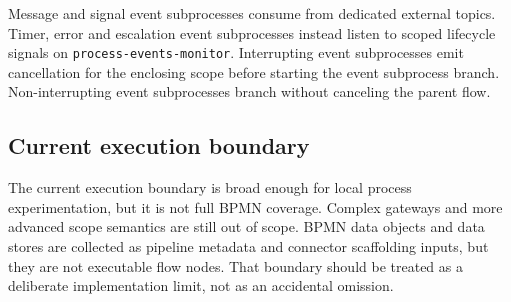 Message and signal event subprocesses consume from dedicated external topics. Timer, error and escalation event subprocesses instead listen to scoped lifecycle signals on \texttt{process-events-monitor}. Interrupting event subprocesses emit cancellation for the enclosing scope before starting the event subprocess branch. Non-interrupting event subprocesses branch without canceling the parent flow.

\subsection{Current execution boundary}

The current execution boundary is broad enough for local process experimentation, but it is not full BPMN coverage. Complex gateways and more advanced scope semantics are still out of scope. BPMN data objects and data stores are collected as pipeline metadata and connector scaffolding inputs, but they are not executable flow nodes. That boundary should be treated as a deliberate implementation limit, not as an accidental omission.

